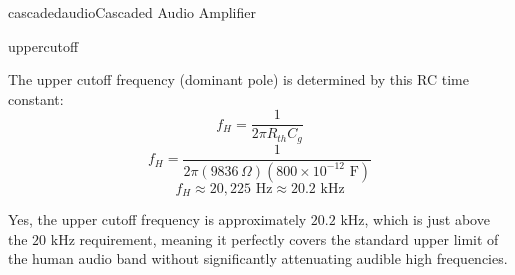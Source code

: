 \begin{mainquestion}{cascadedaudio}{Cascaded Audio Amplifier}
\begin{partquestion}{uppercutoff}
\begin{answer}[3.5in]
        The upper cutoff frequency (dominant pole) is determined by this RC time constant:
        \[f_H = \frac{1}{2\pi R_{th} C_g}\]
        \[f_H = \frac{1}{2\pi (9836\,\Omega) (800 \times 10^{-12}\text{ F})}\]
        \[f_H \approx 20,225\text{ Hz} \approx 20.2\text{ kHz}\]
        
        Yes, the upper cutoff frequency is approximately $20.2\text{ kHz}$, which is just above the $20\text{ kHz}$ requirement, meaning it perfectly covers the standard upper limit of the human audio band without significantly attenuating audible high frequencies.
\end{answer}

\end{partquestion}

\end{mainquestion}
